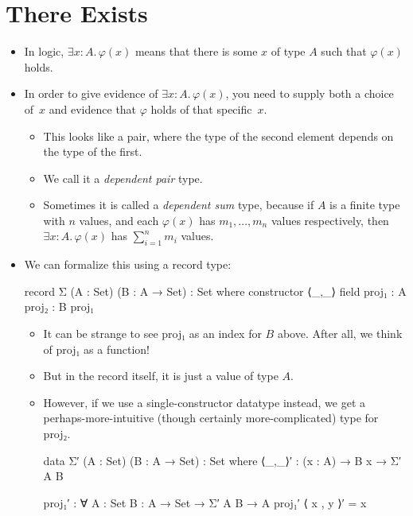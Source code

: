 \documentclass{lecturenotes}
\begin{document}
\section{There Exists}
\label{sec:there-exists}

\begin{itemize}
\item In logic, $\exists x \colon A.\,\varphi(x)$ means that there is some $x$ of type $A$ such that $\varphi(x)$ holds.
\item In order to give evidence of $\exists x \colon A.\,\varphi(x)$, you need to supply both a choice of~$x$ and evidence that $\varphi$ holds of that specific~$x$.
  \begin{itemize}
  \item This looks like a pair, where the type of the second element depends on the type of the first.
  \item We call it a \emph{dependent pair} type.
  \item Sometimes it is called a \emph{dependent sum} type, because if $A$ is a finite type with $n$ values, and each $\varphi(x)$ has $m_1, \dots, m_n$ values respectively, then $\exists x \colon A.\,\varphi(x)$ has $\sum^n_{i=1} m_i$ values.
  \end{itemize}
\item We can formalize this using a record type:
\begin{code}
record Σ (A : Set) (B : A → Set) : Set where
  constructor ⟨_,_⟩
  field
    proj₁ : A
    proj₂ : B proj₁
\end{code}
\begin{itemize}
\item It can be strange to see \textsf{proj₁} as an index for $B$ above.
  After all, we think of \textsf{proj₁} as a function!
\item But in the record itself, it is just a value of type $A$.
\item However, if we use a single-constructor datatype instead, we get a perhaps-more-intuitive (though certainly more-complicated) type for \textsf{proj₂}.
\begin{code}
data Σ′ (A : Set) (B : A → Set) : Set where
  ⟨_,_⟩′ : (x : A) → B x → Σ′ A B

proj₁′ : ∀ {A : Set} {B : A → Set} → Σ′ A B → A
proj₁′ ⟨ x , y ⟩′ = x


\end{code}
\end{itemize}
\end{itemize}
\end{document}
